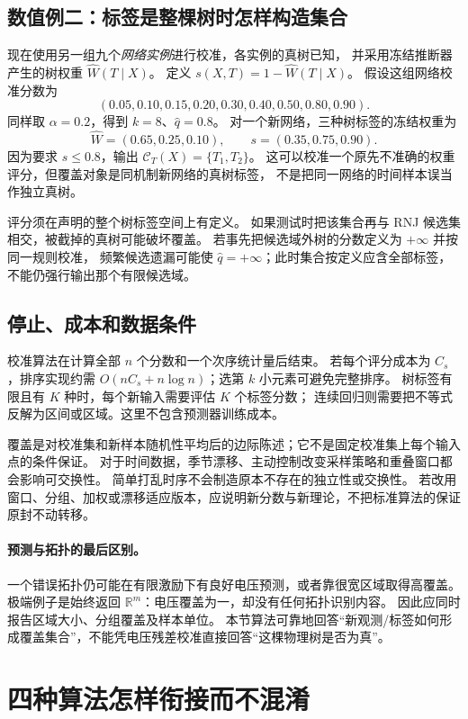 \documentclass[UTF8,11pt,fontset=fandol,openany,oneside]{ctexbook}
\theoremstyle{definition}
\theoremstyle{remark}
\numberwithin{equation}{chapter}
\begin{document}
\subsection{数值例二：标签是整棵树时怎样构造集合}

现在使用另一组九个\emph{网络实例}进行校准，各实例的真树已知，
并采用冻结推断器产生的树权重 $\widehat W(T\mid X)$。
定义 $s(X,T)=1-\widehat W(T\mid X)$。
假设这组网络校准分数为
\[
 (0.05,0.10,0.15,0.20,0.30,0.40,0.50,0.80,0.90).
\]
同样取 $\alpha=0.2$，得到 $k=8$、$\widehat q=0.8$。
对一个新网络，三种树标签的冻结权重为
\[
 \widehat W=(0.65,0.25,0.10),\qquad s=(0.35,0.75,0.90).
\]
因为要求 $s\le0.8$，输出
$\mathcal C_T(X)=\{T_1,T_2\}$。
这可以校准一个原先不准确的权重评分，但覆盖对象是同机制新网络的真树标签，
不是把同一网络的时间样本误当作独立真树。

评分须在声明的整个树标签空间上有定义。
如果测试时把该集合再与 RNJ 候选集相交，被截掉的真树可能破坏覆盖。
若事先把候选域外树的分数定义为 $+\infty$ 并按同一规则校准，
频繁候选遗漏可能使 $\widehat q=+\infty$；此时集合按定义应含全部标签，
不能仍强行输出那个有限候选域。

\subsection{停止、成本和数据条件}

校准算法在计算全部 $n$ 个分数和一个次序统计量后结束。
若每个评分成本为 $C_s$，排序实现约需
$O(nC_s+n\log n)$；选第 $k$ 小元素可避免完整排序。
树标签有限且有 $K$ 种时，每个新输入需要评估 $K$ 个标签分数；
连续回归则需要把不等式反解为区间或区域。这里不包含预测器训练成本。

覆盖是对校准集和新样本随机性平均后的边际陈述；它不是固定校准集上每个输入点的条件保证。
对于时间数据，季节漂移、主动控制改变采样策略和重叠窗口都会影响可交换性。
简单打乱时序不会制造原本不存在的独立性或交换性。
若改用窗口、分组、加权或漂移适应版本，应说明新分数与新理论，不把标准算法的保证原封不动转移。

\paragraph{预测与拓扑的最后区别。}
一个错误拓扑仍可能在有限激励下有良好电压预测，或者靠很宽区域取得高覆盖。
极端例子是始终返回 $\mathbb R^m$：电压覆盖为一，却没有任何拓扑识别内容。
因此应同时报告区域大小、分组覆盖及样本单位。
本节算法可靠地回答“新观测/标签如何形成覆盖集合”，不能凭电压残差校准直接回答“这棵物理树是否为真”。

\section{四种算法怎样衔接而不混淆}
\label{sec:textbook-statistical-connection}
\end{document}
